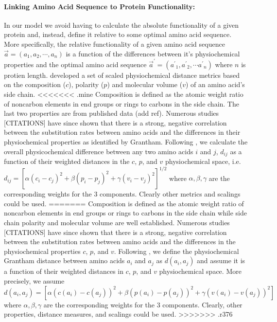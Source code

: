 \documentclass[13pt]{article}
\newcommand{\avecopt}{\ensuremath{\vec{a}^\prime}\xspace}
\newcommand{\aopt}{\ensuremath{a^\prime}\xspace}
\begin{document}
\paragraph*{Linking Amino Acid Sequence to  Protein Functionality:}
In our model we avoid having to calculate the absolute functionality of a given protein and, instead, define it relative to some optimal amino acid sequence.
More specifically, the relative functionality of a given amino acid sequence $\vec{a} = (a_1, a_2, \cdots, a_n)$  is a function of the differences between it's physiochemical properties  and the optimal amino acid sequence $\avecopt = (\aopt_1, \aopt_2, \cdots \aopt_n)$ where $n$ is protien length.
\cite{Grantham74} developed a set of scaled physiochemical distance metrics based on the composition ($c$), polarity ($p$) and molecular volume ($v$) of an amino acid's side chain.
<<<<<<< .mine
Composition is defined as the atomic weight ratio of noncarbon elements in end groups or rings to carbons in the side chain.
The last two properties are from published data (add ref).
Numerous studies [CITATIONS] have since shown that there is a strong, negative correlation between the substitution rates between amino acids and the differences in their physiochemical properties as identified by Grantham.
Following \cite{Grantham74}, we calculate the overall physicochemical difference between any two amino acids $i$ and $j$, $d_{ij}$ as a function of their weighted distances in the $c$, $p$, and $v$ physiochemical space, i.e. $d_{ij} = [\alpha (c_i-c_j)^2 + \beta (p_i - p_j)^2 + \gamma (v_i - v_j)^2]^{1/2}$ where $\alpha, \beta, \gamma$ are the corresponding weights for the 3 components.
Clearly other metrics and scalings could be used.
=======
Composition is defined as the atomic weight ratio of noncarbon elements in end groups or rings to carbons in the side chain while side chain polarity and molecular volume are well established.
Numerous studies [CITATIONS] have since shown that there is a strong, negative correlation between the substitution rates between amino acids and the differences in the physiochemical properties $c$, $p$, and $v$.
Following \citet{Grantham74}, we define the physiochemical Grantham distance between amino acids $a_i$ and $a_j$ as  $d(a_i, a_j)$ and assume it is a function of their weighted distances in $c$, $p$, and $v$ physiochemical space.
More precisely, we assume $d\left(a_i, a_j\right) = [\alpha \left(c\left(a_i\right)-c\left(a_j\right)\right)^2 + \beta\left(p\left(a_i\right) - p\left(a_j\right)\right)^2 + \gamma\left(v\left(a_i\right) - v\left(a_j\right)\right)^2]$ where $\alpha, \beta, \gamma$ are the corresponding weights for the 3 components.
Clearly, other properties, distance measures, and scalings could be used.
>>>>>>> .r376
\end{document}
